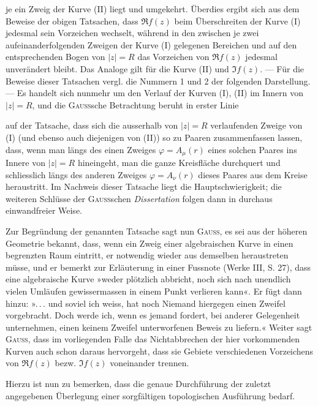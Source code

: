 je ein Zweig der Kurve (II) liegt und umgekehrt. Überdies ergibt sich
aus dem Beweise der obigen Tatsachen, dass \(\Re f(z)\) beim Überschreiten der
Kurve (I) jedesmal sein Vorzeichen wechselt, während in den zwischen je zwei
aufeinanderfolgenden Zweigen der Kurve (I) gelegenen Bereichen und auf den
entsprechenden Bogen von \(|z|=R\) das Vorzeichen von \(\Re f(z)\) jedesmal unverändert
bleibt. Das Analoge gilt für die Kurve (II) und \(\Im f(z)\). — Für die
Beweise dieser Tatsachen vergl. die Nummern 1 und 2 der folgenden Darstellung.
— Es handelt sich nunmehr um den Verlauf der Kurven (I), (II) im
Innern von \(|z|=R\), und die \textsc{Gauss}sche Betrachtung beruht in erster Linie\par
\clearpage{}
\noindent auf der Tatsache, dass sich die ausserhalb von \(|z|=R\) verlaufenden Zweige
von (I) (und ebenso auch diejenigen von (II)) so zu Paaren zusammenfassen
lassen, dass, wenn man längs des einen Zweiges \(\varphi=A_\mu(r)\) eines solchen
Paares ins Innere von \(|z|=R\) hineingeht, man die ganze Kreisfläche durchquert
und schliesslich längs des anderen Zweiges \(\varphi=A_\nu(r)\) dieses Paares aus
dem Kreise heraustritt. Im Nachweis dieser Tatsache liegt die Hauptschwierigkeit;
die weiteren Schlüsse der \textsc{Gauss}schen \textit{Dissertation} folgen dann in durchaus
einwandfreier Weise.
\par
Zur Begründung der genannten Tatsache sagt nun \textsc{Gauss}, es sei aus der
höheren Geometrie bekannt, dass, wenn ein Zweig einer algebraischen Kurve
in einen begrenzten Raum eintritt, er notwendig wieder aus demselben heraustreten
müsse, und er bemerkt zur Erläuterung in einer Fussnote (Werke III,
S. 27), dass eine algebraische Kurve »weder plötzlich abbricht, noch sich nach
unendlich vielen Umläufen gewissermassen in einem Punkt verlieren kann«.
Er fügt dann hinzu: »\mbox{.\,.\,.} und soviel ich weiss, hat noch Niemand hiergegen
einen Zweifel vorgebracht. Doch werde ich, wenn es jemand fordert, bei
anderer Gelegenheit unternehmen, einen keinem Zweifel unterworfenen Beweis
zu liefern.« Weiter sagt \textsc{Gauss}, dass im vorliegenden Falle das Nichtabbrechen
der hier vorkommenden Kurven auch schon daraus hervorgeht, dass
sie Gebiete verschiedenen Vorzeichens von \(\Re f(z)\) bezw. \(\Im f(z)\) voneinander
trennen.
\par
Hierzu ist nun zu bemerken, dass die genaue Durchführung der zuletzt
angegebenen Überlegung einer sorgfältigen topologischen Ausführung bedarf.
